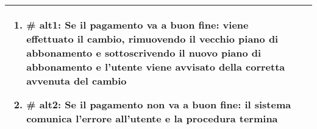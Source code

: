 \begin{center}
\begin{table}[bp]
\begin{tabular}{ |p{2.6cm}|p{13cm}|  }
\begin{enumerate}
\begin{enumerate}[  ]
					\begin{enumerate}[label*=\arabic*.]
						\item \textbf{\# alt1}: Se il pagamento va a buon fine: viene effettuato il cambio, rimuovendo il vecchio piano di abbonamento e sottoscrivendo il nuovo piano di abbonamento e l'utente viene avvisato della corretta avvenuta del cambio
						\item \textbf{\# alt2}: Se il pagamento non va a buon fine: il sistema comunica l'errore all'utente e la procedura termina
					\end{enumerate}
			\end{enumerate}
			\end{enumerate}\\\hline
\end{tabular}
\label{table_use_case:\lastUC}\newline
\end{table}


\end{center}
